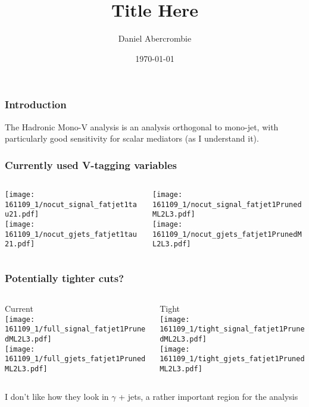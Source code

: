 \documentclass{beamer}
\author[D. Abercrombie]{
  Daniel Abercrombie
}
\title{\bf \sffamily Title Here}
\date{\today}
\begin{document}
\begin{frame}[nonumbering]
  \titlepage
\end{frame}

\begin{frame}
  \frametitle{Introduction}

  The Hadronic Mono-V analysis is an analysis orthogonal to mono-jet,
  with particularly good sensitivity for scalar mediators
  (as I understand it).

\end{frame}

\begin{frame}
  \frametitle{Currently used V-tagging variables}

  \begin{columns}
    \begin{column}{0.5\linewidth}
      \texttt{[image: 161109\_1/nocut\_signal\_fatjet1tau21.pdf]} \\
      \texttt{[image: 161109\_1/nocut\_gjets\_fatjet1tau21.pdf]}
    \end{column}
    \begin{column}{0.5\linewidth}
      \texttt{[image: 161109\_1/nocut\_signal\_fatjet1PrunedML2L3.pdf]} \\
      \texttt{[image: 161109\_1/nocut\_gjets\_fatjet1PrunedML2L3.pdf]}
    \end{column}
  \end{columns}

\end{frame}

\begin{frame}
  \frametitle{Potentially tighter cuts?}

  \begin{columns}
    \begin{column}{0.5\linewidth}
      Current \\
      \texttt{[image: 161109\_1/full\_signal\_fatjet1PrunedML2L3.pdf]} \\
      \texttt{[image: 161109\_1/full\_gjets\_fatjet1PrunedML2L3.pdf]}
    \end{column}
    \begin{column}{0.5\linewidth}
      Tight \\
      \texttt{[image: 161109\_1/tight\_signal\_fatjet1PrunedML2L3.pdf]} \\
      \texttt{[image: 161109\_1/tight\_gjets\_fatjet1PrunedML2L3.pdf]}
    \end{column}
  \end{columns}

  I don't like how they look in $\gamma$ + jets, a rather important region for the analysis

\end{frame}
\end{document}
